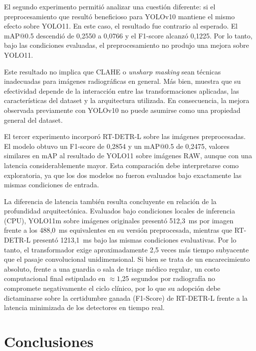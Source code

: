 \documentclass[conference]{IEEEtran}
\begin{document}
El segundo experimento permitió analizar una cuestión diferente: si el preprocesamiento que resultó beneficioso para YOLOv10 mantiene el mismo efecto sobre YOLO11. En este caso, el resultado fue contrario al esperado. El mAP@0.5 descendió de 0,2550 a 0,0766 y el F1-score alcanzó 0,1225. Por lo tanto, bajo las condiciones evaluadas, el preprocesamiento no produjo una mejora sobre YOLO11.

Este resultado no implica que CLAHE o \textit{unsharp masking} sean técnicas inadecuadas para imágenes radiográficas en general. Más bien, muestra que su efectividad depende de la interacción entre las transformaciones aplicadas, las características del dataset y la arquitectura utilizada. En consecuencia, la mejora observada previamente con YOLOv10 no puede asumirse como una propiedad general del dataset.

El tercer experimento incorporó RT-DETR-L sobre las imágenes preprocesadas. El modelo obtuvo un F1-score de 0,2854 y un mAP@0.5 de 0,2475, valores similares en mAP al resultado de YOLO11 sobre imágenes RAW, aunque con una latencia considerablemente mayor. Esta comparación debe interpretarse como exploratoria, ya que los dos modelos no fueron evaluados bajo exactamente las mismas condiciones de entrada.

La diferencia de latencia también resulta concluyente en relación de la profundidad arquitectónica. Evaluados bajo condiciones locales de inferencia (CPU), YOLO11m sobre imágenes originales presentó 512,3~ms por imagen frente a los 488,0~ms equivalentes en su versión preprocesada, mientras que RT-DETR-L presentó 1213,1~ms bajo las mismas condiciones evaluativas. Por lo tanto, el transformador exige aproximadamente 2,5 veces más tiempo subyacente que el pasaje convolucional unidimensional. Si bien se trata de un encarecimiento absoluto, frente a una guardia o sala de triage médico regular, un costo computacional final estipulado en $\approx 1$,25 segundos por radiografía no compromete negativamente el ciclo clínico, por lo que su adopción debe dictaminarse sobre la certidumbre ganada (F1-Score) de RT-DETR-L frente a la latencia minimizada de los detectores en tiempo real.



\section{Conclusiones}
\end{document}
